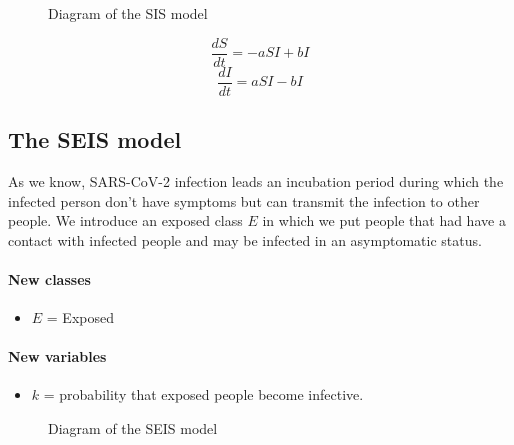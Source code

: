 \documentclass[12pt]{llncs}
\begin{document}
\begin{figure}[H]
	\centering
    \caption{Diagram of the SIS model}
\end{figure}

$$\frac{dS}{dt} = -aSI + bI$$
$$\frac{dI}{dt} = aSI - bI$$

\subsection{The SEIS model}
As we know, SARS-CoV-2 infection leads an incubation period during which the infected person don't have symptoms but can transmit the infection to other people. We introduce an exposed class $E$ in which we put people that had have a contact with infected people and may be infected in an asymptomatic status.

\paragraph{New classes}
\begin{itemize}
\item $E$ = Exposed
\end{itemize}

\paragraph{New variables}
\begin{itemize}
\item $k$ = probability that exposed people become infective.
\end{itemize}

\begin{figure}
	\centering
    \caption{Diagram of the SEIS model}
\end{figure}
\end{document}
